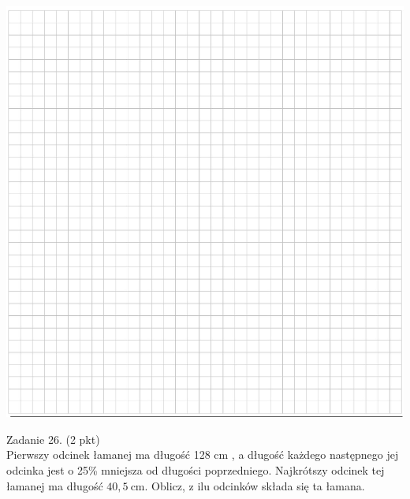 \documentclass[10pt]{article}
\begin{document}
\includegraphics[max width=\textwidth, center]{2024_11_21_6438f6dbc3784fe6d1deg-10(1)}

Zadanie 26. (2 pkt)\\
Pierwszy odcinek łamanej ma długość 128 cm , a długość każdego następnego jej odcinka jest o 25\% mniejsza od długości poprzedniego. Najkrótszy odcinek tej łamanej ma długość \(40,5 \mathrm{~cm}\). Oblicz, z ilu odcinków składa się ta łamana.
\end{document}
